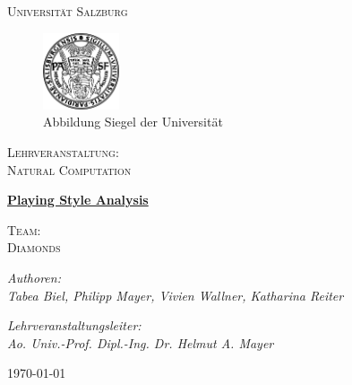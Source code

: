 \documentclass{llncs}
\begin{document}
\begin{titlepage}\centering
  
{\scshape\LARGE Universität Salzburg \par}
	\vspace{1cm}  
\begin{figure}
\centering
\includegraphics[width=0.2\textwidth]{uni_siegel.png}
\caption{\label{fig:uni_siegel}Abbildung Siegel der Universität}
\end{figure}
    
	
	{\scshape\Large Lehrveranstaltung: \\
    Natural Computation\par}
	\vspace{1cm}
	{\huge\bfseries \uline{Playing Style Analysis}\par}
	\vspace{0.5cm} 
    
    {\scshape\Large Team: \\
Diamonds \par}
	\vspace{1cm}
    
	{\Large\itshape Authoren:\\ Tabea Biel, Philipp Mayer, Vivien Wallner, Katharina Reiter \par}
	\vfill
	{\Large\itshape Lehrveranstaltungsleiter: \\
	Ao. Univ.-Prof. Dipl.-Ing. Dr. Helmut A. Mayer \\ \textsc{}}

	\vfill

	{\large \today\par}
\end{titlepage}
\end{document}
